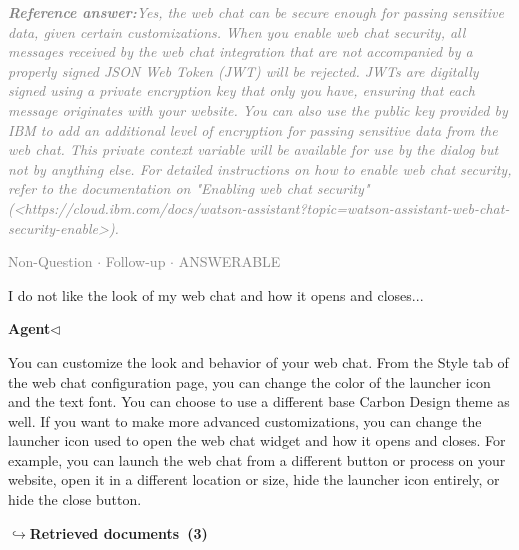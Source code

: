 \documentclass[a4paper,11pt]{article}
\begin{document}
\begin{refanswerenv}
{\footnotesize\textit{\textcolor{gray}{\textbf{Reference answer:}\enspace Yes, the web chat can be secure enough for passing sensitive data, given certain customizations. When you enable web chat security, all messages received by the web chat integration that are not accompanied by a properly signed JSON Web Token (JWT) will be rejected. JWTs are digitally signed using a private encryption key that only you have, ensuring that each message originates with your website. You can also use the public key provided by IBM to add an additional level of encryption for passing sensitive data from the web chat. This private context variable will be available for use by the dialog but not by anything else. For detailed instructions on how to enable web chat security, refer to the documentation on "Enabling web chat security" (<https://cloud.ibm.com/docs/watson-assistant?topic=watson-assistant-web-chat-security-enable>).}}}
\end{refanswerenv}
\vspace{0.5em}
\hfill{\tiny\textcolor{gray}{Non-Question $\cdot$ Follow-up $\cdot$ ANSWERABLE}}
\begin{userbubble}
I do not like the look of my web chat and how it opens and closes...
\end{userbubble}
\noindent\hfill{\small\textcolor{agentcolor}{\textbf{Agent\enspace$\triangleleft$}}}
\begin{agentbubble}
You can customize the look and behavior of your web chat. From the Style tab of the web chat configuration page, you can change the color of the launcher icon and the text font. You can choose to use a different base Carbon Design theme as well. If you want to make more advanced customizations, you can change the launcher icon used to open the web chat widget and how it opens and closes. For example, you can launch the web chat from a different button or process on your website, open it in a different location or size, hide the launcher icon entirely, or hide the close button. 
\end{agentbubble}
\noindent\hfill{\footnotesize\textcolor{doccolor}{\textbf{$\hookrightarrow$\enspace Retrieved documents~(3)}}}
\end{document}
